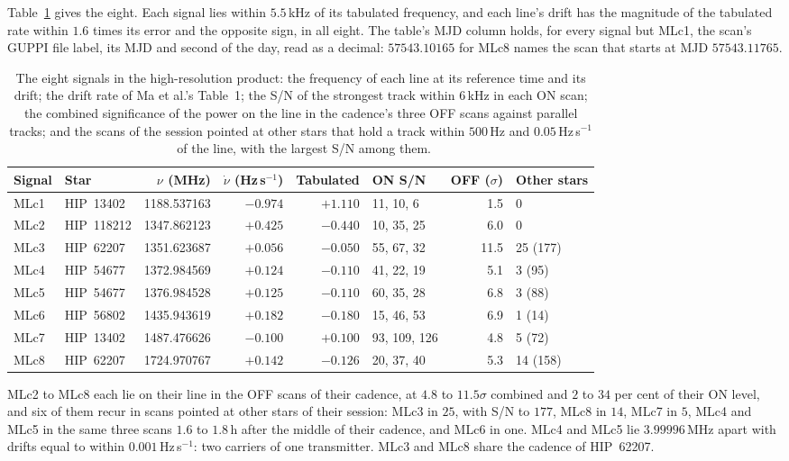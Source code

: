 \documentclass[3p,11pt]{elsarticle}
\newcommand{\hzs}{Hz\,s$^{-1}$}
\begin{document}
Table~\ref{tab:soi} gives the eight. Each signal lies within $5.5$\,kHz of its tabulated frequency, and each line's
drift has the magnitude of the tabulated rate within $1.6$ times its error and the opposite sign, in all eight. The table's MJD
column holds, for every signal but MLc1, the scan's GUPPI file label, its MJD and second of the day, read as a decimal:
$57543.10165$ for MLc8 names the scan that starts at MJD $57543.11765$.

\begin{table}[t]
\centering\small
\caption{The eight signals in the high-resolution product: the frequency of each line at its reference time and its
drift; the drift rate of Ma et al.'s Table~1; the S/N of the strongest track within $6$\,kHz in each ON scan; the
combined significance of the power on the line in the cadence's three OFF scans against parallel tracks; and the scans
of the session pointed at other stars that hold a track within $500$\,Hz and $0.05$\,\hzs\ of the line, with the
largest S/N among them.}
\label{tab:soi}
\begin{tabular}{llrrrlrl}
\toprule
Signal & Star & $\nu$ (MHz) & $\dot\nu$ (\hzs) & Tabulated & ON S/N & OFF ($\sigma$) & Other stars \\
\midrule
MLc1 & HIP~13402 & 1188.537163 & $-0.974$ & $+1.110$ & 11, 10, 6 & 1.5 & 0 \\
MLc2 & HIP~118212 & 1347.862123 & $+0.425$ & $-0.440$ & 10, 35, 25 & 6.0 & 0 \\
MLc3 & HIP~62207 & 1351.623687 & $+0.056$ & $-0.050$ & 55, 67, 32 & 11.5 & 25 (177) \\
MLc4 & HIP~54677 & 1372.984569 & $+0.124$ & $-0.110$ & 41, 22, 19 & 5.1 & 3 (95) \\
MLc5 & HIP~54677 & 1376.984528 & $+0.125$ & $-0.110$ & 60, 35, 28 & 6.8 & 3 (88) \\
MLc6 & HIP~56802 & 1435.943619 & $+0.182$ & $-0.180$ & 15, 46, 53 & 6.9 & 1 (14) \\
MLc7 & HIP~13402 & 1487.476626 & $-0.100$ & $+0.100$ & 93, 109, 126 & 4.8 & 5 (72) \\
MLc8 & HIP~62207 & 1724.970767 & $+0.142$ & $-0.126$ & 20, 37, 40 & 5.3 & 14 (158) \\
\bottomrule
\end{tabular}
\end{table}

MLc2 to MLc8 each lie on their line in the OFF scans of their cadence, at $4.8$ to $11.5\sigma$ combined and $2$ to
$34$ per cent of their ON level, and six of them recur in scans pointed at other stars of their session: MLc3 in $25$,
with S/N to $177$, MLc8 in $14$, MLc7 in $5$, MLc4 and MLc5 in the same three scans $1.6$ to $1.8$\,h after the middle
of their cadence, and MLc6 in one. MLc4 and MLc5 lie $3.99996$\,MHz apart with drifts equal to within $0.001$\,\hzs:
two carriers of one transmitter. MLc3 and MLc8 share the cadence of HIP~62207.
\end{document}

